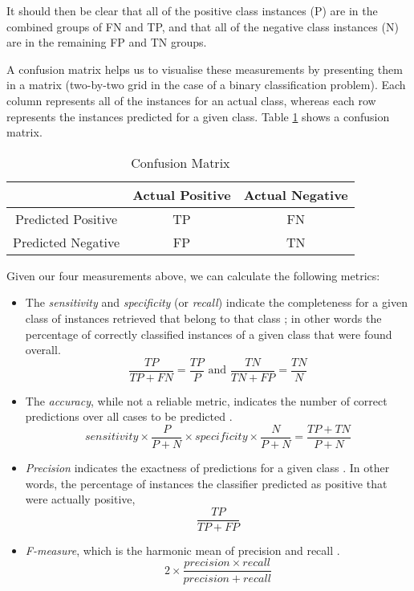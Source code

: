 It should then be clear that all of the positive class instances (P) are in the combined groups of FN and TP, and that all of the negative class instances (N) are in the remaining FP and TN groups.

A confusion matrix helps us to visualise these measurements by presenting them in a matrix (two-by-two grid in the case of a binary classification problem). Each column represents all of the instances for an actual class, whereas each row represents the instances predicted for a given class. Table \ref{table:confusion_matrix} shows a confusion matrix.

\begin{table}[]
\centering
\caption{Confusion Matrix\label{table:confusion_matrix}}
\begin{tabular}{|c|c|c|}
\hline
                   & Actual Positive & Actual Negative \\ \hline
Predicted Positive & TP              & FN              \\ \hline
Predicted Negative & FP              & TN              \\ \hline
\end{tabular}
\end{table}

Given our four measurements above, we can calculate the following metrics:
\begin{itemize}
\item The \textit{sensitivity} and \textit{specificity} (or \textit{recall}) indicate the completeness for a given class of instances retrieved that belong to that class \cite[96]{japkowicz2011evaluating}; in other words the percentage of correctly classified instances of a given class that were found overall.
\begin{equation}
\frac{TP}{TP+FN}=\frac{TP}{P} \text{ and } \frac{TN}{TN+FP}=\frac{TN}{N}
\end{equation}
\item The \textit{accuracy}, while not a reliable metric, indicates the number of correct predictions over all cases to be predicted \cite[86]{japkowicz2011evaluating}.
\begin{equation}
sensitivity\times\frac{P}{P+N}\times specificity\times\frac{N}{P+N} = \frac{TP+TN}{P+N}
\end{equation}
\item \textit{Precision} indicates the exactness of predictions for a given class \cite[99]{japkowicz2011evaluating}. In other words, the percentage of instances the classifier predicted as positive that were actually positive,\begin{equation}\frac{TP}{TP+FP}\end{equation}
\item \textit{F-measure}, which is the harmonic mean of precision and recall \cite[103]{japkowicz2011evaluating}. \begin{equation}2\times\frac{precision\times recall}{precision+recall}\end{equation}
\end{itemize}

